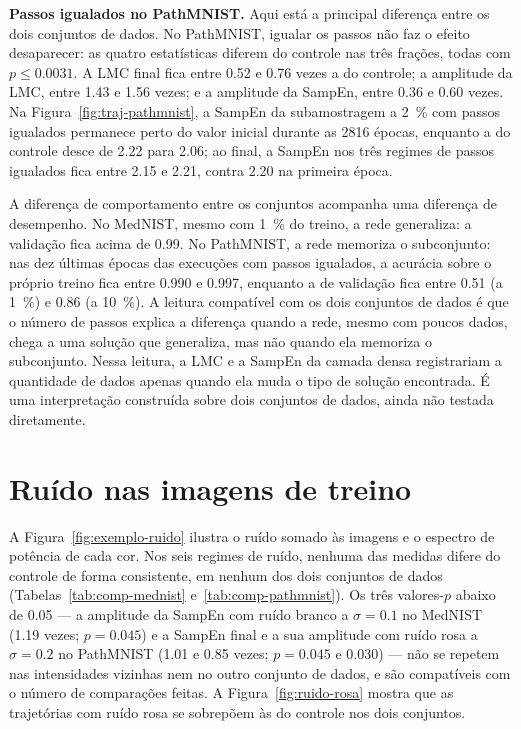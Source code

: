 \textbf{Passos igualados no PathMNIST.} Aqui está a principal diferença
entre os dois conjuntos de dados. No PathMNIST, igualar os passos não faz o
efeito desaparecer: as quatro estatísticas diferem do controle nas três
frações, todas com $p \le \num{0,0031}$. A LMC final fica entre \num{0,52} e
\num{0,76} vezes a do controle; a amplitude da LMC, entre \num{1,43} e
\num{1,56} vezes; e a amplitude da SampEn, entre \num{0,36} e \num{0,60} vezes.
Na Figura~\ref{fig:traj-pathmnist}, a SampEn da subamostragem a
\SI{2}{\percent} com passos igualados permanece perto do valor inicial durante
as \num{2816} épocas, enquanto a do controle desce de \num{2,22} para
\num{2,06}; ao final, a SampEn nos três regimes de passos igualados fica entre
\num{2,15} e \num{2,21}, contra \num{2,20} na primeira época.

A diferença de comportamento entre os conjuntos acompanha uma diferença de
desempenho. No MedNIST, mesmo com \SI{1}{\percent} do treino, a rede
generaliza: a validação fica acima de \num{0,99}. No PathMNIST, a rede
memoriza o subconjunto: nas dez últimas épocas das execuções com passos
igualados, a acurácia sobre o próprio treino fica entre \num{0,990} e
\num{0,997}, enquanto a de validação fica entre \num{0,51} (a
\SI{1}{\percent}) e \num{0,86} (a \SI{10}{\percent}). A leitura compatível com
os dois conjuntos de dados é que o número de passos explica a diferença quando
a rede, mesmo com poucos dados, chega a uma solução que generaliza, mas não
quando ela memoriza o subconjunto. Nessa leitura, a LMC e a SampEn da camada
densa registrariam a quantidade de dados apenas quando ela muda o tipo de
solução encontrada. É uma interpretação construída sobre dois conjuntos de
dados, ainda não testada diretamente.

\section{Ruído nas imagens de treino}
\label{sec:res-ruido-imagem}

A Figura~\ref{fig:exemplo-ruido} ilustra o ruído somado às imagens e o espectro
de potência de cada cor. Nos seis regimes de ruído, nenhuma das medidas difere
do controle de forma consistente, em nenhum dos dois conjuntos de dados
(Tabelas~\ref{tab:comp-mednist} e~\ref{tab:comp-pathmnist}). Os três valores-$p$
abaixo de \num{0,05} --- a amplitude da SampEn com ruído branco a
$\sigma = \num{0,1}$ no MedNIST (\num{1,19} vezes; $p = \num{0,045}$) e a SampEn
final e a sua amplitude com ruído rosa a $\sigma = \num{0,2}$ no PathMNIST
(\num{1,01} e \num{0,85} vezes; $p = \num{0,045}$ e \num{0,030}) --- não se
repetem nas intensidades vizinhas nem no outro conjunto de dados, e são
compatíveis com o número de comparações feitas. A
Figura~\ref{fig:ruido-rosa} mostra que as trajetórias com ruído rosa se
sobrepõem às do controle nos dois conjuntos.

